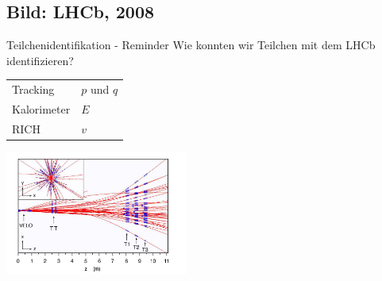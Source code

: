 \subsection{Bild: LHCb, 2008}
\begin{frame}{Teilchenidentifikation - Reminder}
Wie konnten wir Teilchen mit dem LHCb identifizieren? \\
\vspace{0.5cm}
\begin{center}
    \begin{tabular}{ll}
    Tracking &  $p$ und $q$\\
    Kalorimeter & $E$ \\
    RICH & $v$ \\
\end{tabular}
\end{center}

\vspace{0.5cm}
\begin{center}
    \includegraphics[width = 0.45\textwidth]{Figures Lecture on Datanalysis/2D-Eventdisplay.png}
\end{center}  
\end{frame}
\subsection{}




